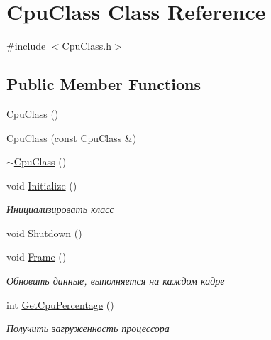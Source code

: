 \hypertarget{class_cpu_class}{}\section{Cpu\+Class Class Reference}
\label{class_cpu_class}


{\ttfamily \#include $<$Cpu\+Class.\+h$>$}

\subsection*{Public Member Functions}
\begin{DoxyCompactItemize}
\item 
\hyperlink{class_cpu_class_a19be0f88b8c5f5d5a1762c3fe673502d}{Cpu\+Class} ()
\item 
\hyperlink{class_cpu_class_a16bc5f522eb19dc054761be36a1ffbd2}{Cpu\+Class} (const \hyperlink{class_cpu_class}{Cpu\+Class} \&)
\item 
\hyperlink{class_cpu_class_a9061f4ed0400c55a2aa1fad8610c172c}{$\sim$\+Cpu\+Class} ()
\item 
void \hyperlink{class_cpu_class_ace3760660eec61879db91b40304e583f}{Initialize} ()
\begin{DoxyCompactList}\small\item\em Инициализировать класс \end{DoxyCompactList}\item 
void \hyperlink{class_cpu_class_a1f2472c6a5667d43eee7e9cd8a41c65d}{Shutdown} ()
\item 
void \hyperlink{class_cpu_class_ad8c0d558a405c27c646c24ab327606d5}{Frame} ()
\begin{DoxyCompactList}\small\item\em Обновить данные, выполняется на каждом кадре \end{DoxyCompactList}\item 
int \hyperlink{class_cpu_class_ac6e6a24f919cc119c95aab883beb3461}{Get\+Cpu\+Percentage} ()
\begin{DoxyCompactList}\small\item\em Получить загруженность процессора \end{DoxyCompactList}\end{DoxyCompactItemize}
